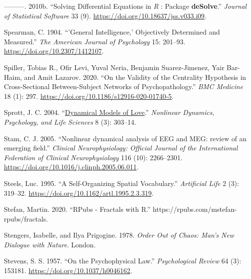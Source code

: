 \documentclass[
  a4paper,
  DIV=11,
  numbers=noendperiod]{scrreprt}
\newlength{\cslhangindent}
\newlength{\cslentryspacingunit} %
\newenvironment{CSLReferences}[2] %
 {%
  \setlength{\parindent}{0pt}
  \ifodd #1
  \let\oldpar\par
  \def\par{\hangindent=\cslhangindent\oldpar}
  \fi
  \setlength{\parskip}{#2\cslentryspacingunit}
 }%
 {}
\begin{document}
\begin{CSLReferences}{1}{0}
\leavevmode{}%
---------. 2010b. {``Solving Differential Equations in {\emph{R}} :
Package {\textbf{deSolve}}.''} \emph{Journal of Statistical Software} 33
(9). \url{https://doi.org/10.18637/jss.v033.i09}.

\leavevmode{}%
Spearman, C. 1904. {``'{General} Intelligence,' Objectively Determined
and Measured.''} \emph{The American Journal of Psychology} 15: 201--93.
\url{https://doi.org/10.2307/1412107}.

\leavevmode{}%
Spiller, Tobias R., Ofir Levi, Yuval Neria, Benjamin Suarez-Jimenez,
Yair Bar-Haim, and Amit Lazarov. 2020. {``On the Validity of the
Centrality Hypothesis in Cross-Sectional Between-Subject Networks of
Psychopathology.''} \emph{BMC Medicine} 18 (1): 297.
\url{https://doi.org/10.1186/s12916-020-01740-5}.

\leavevmode{}%
Sprott, J. C. 2004.
{``\href{https://www.ncbi.nlm.nih.gov/pubmed/15233877}{Dynamical Models
of Love}.''} \emph{Nonlinear Dynamics, Psychology, and Life Sciences} 8
(3): 303--14.

\leavevmode{}%
Stam, C. J. 2005. {``Nonlinear dynamical analysis of EEG and MEG: review
of an emerging field.''} \emph{Clinical Neurophysiology: Official
Journal of the International Federation of Clinical Neurophysiology} 116
(10): 2266--2301. \url{https://doi.org/10.1016/j.clinph.2005.06.011}.

\leavevmode{}%
Steels, Luc. 1995. {``A {Self-Organizing Spatial Vocabulary}.''}
\emph{Artificial Life} 2 (3): 319--32.
\url{https://doi.org/10.1162/artl.1995.2.3.319}.

\leavevmode{}%
Stefan, Martin. 2020. {``{RPubs} - {Fractals} with {R}.''}
https://rpubs.com/mstefan-rpubs/fractals.

\leavevmode{}%
Stengers, Isabelle, and Ilya Prigogine. 1978. \emph{Order {Out} of
{Chaos}: {Man}'s {New Dialogue} with {Nature}}. {London}.

\leavevmode{}%
Stevens, S. S. 1957. {``On the Psychophysical Law.''}
\emph{Psychological Review} 64 (3): 153181.
\url{https://doi.org/10.1037/h0046162}.


\end{CSLReferences}
\end{document}
